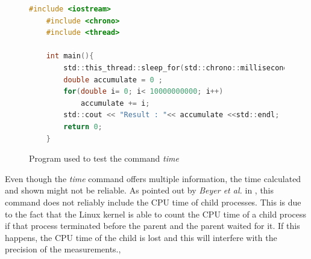 \begin{figure}[h]
\begin{lstlisting}[language=c]
    #include <iostream>
    #include <chrono>
    #include <thread>
    
    int main(){
        std::this_thread::sleep_for(std::chrono::milliseconds(1000));
        double accumulate = 0 ;
        for(double i= 0; i< 10000000000; i++)
            accumulate += i;
        std::cout << "Result : "<< accumulate <<std::endl;  
        return 0;
    }
\end{lstlisting}
\caption{Program used to test the command \textit{time}}
\label{fig:time_code_cpp}
\end{figure}


Even though the \textit{time} command offers multiple information, the time calculated and shown might not be reliable. As pointed out by \textit{Beyer et al.} in \cite{Beyer2017ReliableBR}, this command does not reliably include the CPU time of child processes. This is due to the fact that the Linux kernel is able to count the CPU time of a child process if that process terminated before the parent and the parent waited for it. If this happens, the CPU time of the child is lost and this will interfere with the precision of the measurements.\cite{Beyer2017ReliableBR},\\ \hfill

